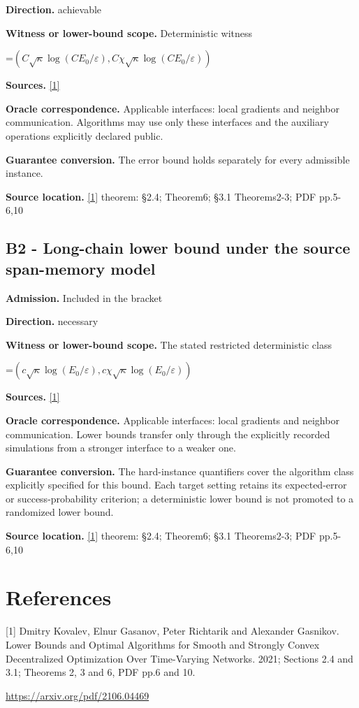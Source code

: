 \documentclass[10pt,a4paper]{article}
\newcommand{\AtlasMath}[1]{\par\begingroup\centering\setbox0=\hbox{$\displaystyle #1$}\ifdim\wd0>1.4\linewidth\typeout{ATLAS WIDE FORMULA: \the\wd0}\fi\ifdim\wd0>\linewidth\resizebox{\linewidth}{!}{\box0}\else\box0\fi\par\endgroup}
\begin{document}
\textbf{Direction.} achievable

\textbf{Witness or lower-bound scope.} Deterministic witness

\AtlasMath{(C\sqrt\kappa\log(CE_0/\varepsilon),C\chi\sqrt\kappa\log(CE_0/\varepsilon))}
\textbf{Sources.} \href{https://arxiv.org/pdf/2106.04469}{[1]}

\textbf{Oracle correspondence.} Applicable interfaces: local gradients and neighbor communication. Algorithms may use only these interfaces and the auxiliary operations explicitly declared public.

\textbf{Guarantee conversion.} The error bound holds separately for every admissible instance.

\textbf{Source location.} \href{https://arxiv.org/pdf/2106.04469}{[1]} theorem: §2.4; Theorem6; §3.1 Theorems2-3; PDF pp.5-6,10

\subsection{B2 - Long-chain lower bound under the source span-memory model}
\textbf{Admission.} Included in the bracket

\textbf{Direction.} necessary

\textbf{Witness or lower-bound scope.} The stated restricted deterministic class

\AtlasMath{(c\sqrt\kappa\log(E_0/\varepsilon),c\chi\sqrt\kappa\log(E_0/\varepsilon))}
\textbf{Sources.} \href{https://arxiv.org/pdf/2106.04469}{[1]}

\textbf{Oracle correspondence.} Applicable interfaces: local gradients and neighbor communication. Lower bounds transfer only through the explicitly recorded simulations from a stronger interface to a weaker one.

\textbf{Guarantee conversion.} The hard-instance quantifiers cover the algorithm class explicitly specified for this bound. Each target setting retains its expected-error or success-probability criterion; a deterministic lower bound is not promoted to a randomized lower bound.

\textbf{Source location.} \href{https://arxiv.org/pdf/2106.04469}{[1]} theorem: §2.4; Theorem6; §3.1 Theorems2-3; PDF pp.5-6,10

\section{References}
[1] Dmitry Kovalev, Elnur Gasanov, Peter Richtarik and Alexander Gasnikov. Lower Bounds and Optimal Algorithms for Smooth and Strongly Convex Decentralized Optimization Over Time-Varying Networks. 2021; Sections 2.4 and 3.1; Theorems 2, 3 and 6, PDF pp.6 and 10.

\url{https://arxiv.org/pdf/2106.04469}
\end{document}
